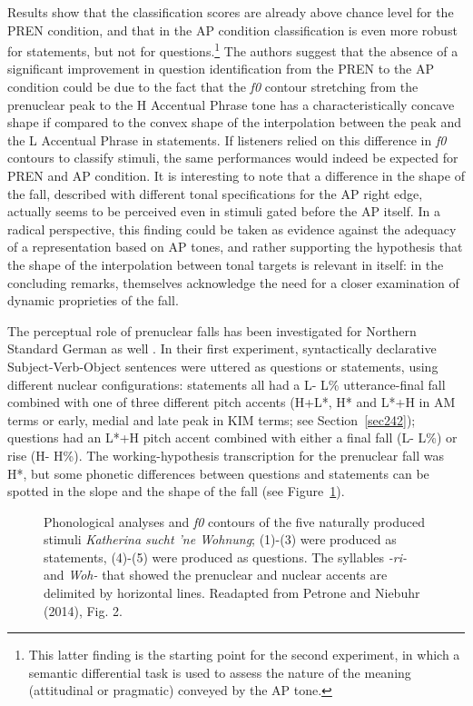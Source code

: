 Results show that the classification scores are already above chance level for the PREN condition, and that in the AP condition classification is even more robust for statements, but not for questions.\footnote{This latter finding is the starting point for the second experiment, in which a semantic differential task is used to assess the nature of the meaning (attitudinal or pragmatic) conveyed by the AP tone.} The authors suggest that the absence of a significant improvement in question identification from the PREN to the AP condition could be due to the fact that the \textit{f0} contour stretching from the prenuclear peak to the H Accentual Phrase tone has a characteristically concave shape if compared to the convex shape of the interpolation between the peak and the L Accentual Phrase in statements. If listeners relied on this difference in \textit{f0} contours to classify stimuli, the same performances would indeed be expected for PREN and AP condition. It is interesting to note that a difference in the shape of the fall, described with different tonal specifications for the AP right edge, actually seems to be perceived even in stimuli gated before the AP itself. In a radical perspective, this finding could be taken as evidence against the adequacy of a representation based on AP tones, and rather supporting the hypothesis that the shape of the interpolation between tonal targets is relevant in itself: in the concluding remarks, \citeauthor{petrone2011tones} themselves acknowledge the need for a closer examination of dynamic proprieties of the fall.

The perceptual role of prenuclear falls has been investigated for Northern Standard German as well \citep{petrone2014intonation}. In their first experiment, syntactically declarative Subject-Verb-Object sentences were uttered as questions or statements, using different nuclear configurations: statements all had a L- L\% utterance-final fall combined with one of three different pitch accents (H+L*, H* and L*+H in AM terms or early, medial and late peak in KIM terms; see Section~\ref{sec242}); questions had an L*+H pitch accent combined with either a final fall (L- L\%) or rise (H- H\%). The working-hypothesis transcription for the prenuclear fall was H*, but some phonetic differences between questions and statements can be spotted in the slope and the shape of the fall (see Figure~\ref{fig302}).

\begin{figure}
\centering
{}
\caption{Phonological analyses and \textit{f0} contours of the five naturally produced stimuli \textit{Katherina sucht 'ne Wohnung}; (1)-(3) were produced as statements, (4)-(5) were produced as questions. The syllables \textit{-ri-} and \textit{Woh-} that showed the prenuclear and nuclear accents are delimited by horizontal lines. Readapted from Petrone and Niebuhr (2014), Fig. 2.}
\label{fig302}\end{figure}

